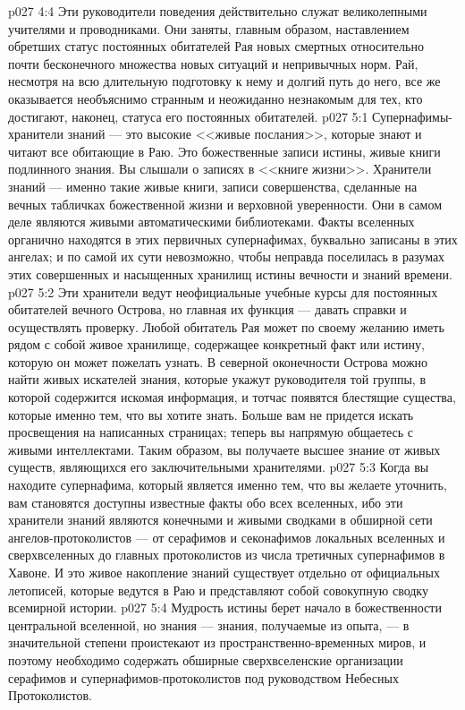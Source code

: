 \vs p027 4:4 Эти руководители поведения действительно служат великолепными учителями и проводниками. Они заняты, главным образом, наставлением обретших статус постоянных обитателей Рая новых смертных относительно почти бесконечного множества новых ситуаций и непривычных норм. Рай, несмотря на всю длительную подготовку к нему и долгий путь до него, все же оказывается необъяснимо странным и неожиданно незнакомым для тех, кто достигают, наконец, статуса его постоянных обитателей.
\vs p027 5:1 Супернафимы\hyp{}хранители знаний --- это высокие <<живые послания>>, которые знают и читают все обитающие в Раю. Это божественные записи истины, живые книги подлинного знания. Вы слышали о записях в <<книге жизни>>. Хранители знаний --- именно такие живые книги, записи совершенства, сделанные на вечных табличках божественной жизни и верховной уверенности. Они в самом деле являются живыми автоматическими библиотеками. Факты вселенных органично находятся в этих первичных супернафимах, буквально записаны в этих ангелах; и по самой их сути невозможно, чтобы неправда поселилась в разумах этих совершенных и насыщенных хранилищ истины вечности и знаний времени.
\vs p027 5:2 Эти хранители ведут неофициальные учебные курсы для постоянных обитателей вечного Острова, но главная их функция --- давать справки и осуществлять проверку. Любой обитатель Рая может по своему желанию иметь рядом с собой живое хранилище, содержащее конкретный факт или истину, которую он может пожелать узнать. В северной оконечности Острова можно найти живых искателей знания, которые укажут руководителя той группы, в которой содержится искомая информация, и тотчас появятся блестящие существа, которые  именно тем, что вы хотите знать. Больше вам не придется искать просвещения на написанных страницах; теперь вы напрямую общаетесь с живыми интеллектами. Таким образом, вы получаете высшее знание от живых существ, являющихся его заключительными хранителями.
\vs p027 5:3 Когда вы находите супернафима, который является именно тем, что вы желаете уточнить, вам становятся доступны  известные факты обо всех вселенных, ибо эти хранители знаний являются конечными и живыми сводками в обширной сети ангелов\hyp{}протоколистов --- от серафимов и секонафимов локальных вселенных и сверхвселенных до главных протоколистов из числа третичных супернафимов в Хавоне. И это живое накопление знаний существует отдельно от официальных летописей, которые ведутся в Раю и представляют собой совокупную сводку всемирной истории.
\vs p027 5:4 Мудрость истины берет начало в божественности центральной вселенной, но знания --- знания, получаемые из опыта, --- в значительной степени проистекают из пространственно\hyp{}временных миров, и поэтому необходимо содержать обширные сверхвселенские организации серафимов и супернафимов\hyp{}протоколистов под руководством Небесных Протоколистов.
